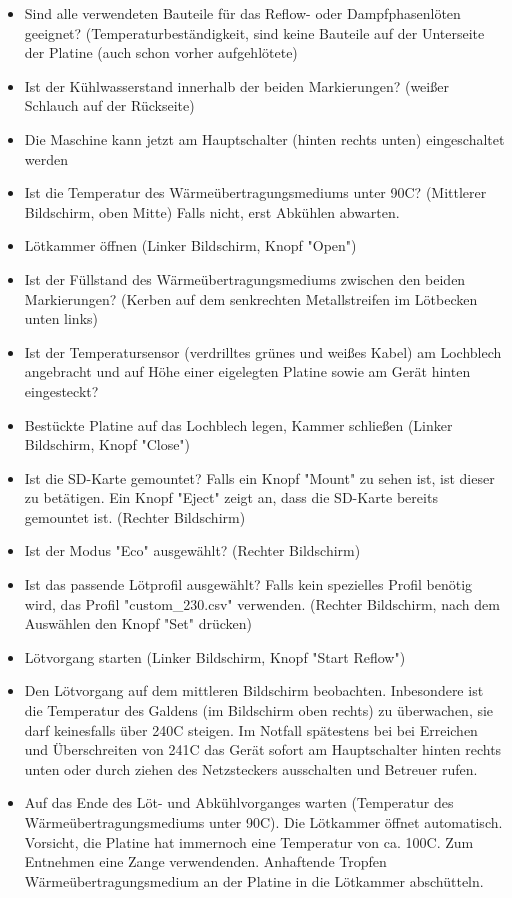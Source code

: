 \documentclass{\basedir/fablab-document}
\begin{document}
	\begin{itemize}

	\item Sind alle verwendeten Bauteile für das Reflow- oder Dampfphasenlöten geeignet? (Temperaturbeständigkeit, sind keine Bauteile auf der Unterseite der Platine (auch schon vorher aufgehlötete)
	\item Ist der Kühlwasserstand innerhalb der beiden Markierungen? (weißer Schlauch auf der Rückseite) 
	\item Die Maschine kann jetzt am Hauptschalter (hinten rechts unten) eingeschaltet werden
	\item Ist die Temperatur des Wärmeübertragungsmediums unter 90C? (Mittlerer Bildschirm, oben Mitte) Falls nicht, erst Abkühlen abwarten.
	\item Lötkammer öffnen (Linker Bildschirm, Knopf "Open")
	\item Ist der Füllstand des Wärmeübertragungsmediums zwischen den beiden Markierungen? (Kerben auf dem senkrechten Metallstreifen im Lötbecken unten links)
	\item Ist der Temperatursensor (verdrilltes grünes und weißes Kabel) am Lochblech angebracht und auf Höhe einer eigelegten Platine sowie am Gerät hinten eingesteckt?
	\item Bestückte Platine auf das Lochblech legen, Kammer schließen (Linker Bildschirm, Knopf "Close")
	\item Ist die SD-Karte gemountet? Falls ein Knopf "Mount" zu sehen ist, ist dieser zu betätigen. Ein Knopf "Eject" zeigt an, dass die SD-Karte bereits gemountet ist. (Rechter Bildschirm)
	\item Ist der Modus "Eco" ausgewählt? (Rechter Bildschirm)
	\item Ist das passende Lötprofil ausgewählt? Falls kein spezielles Profil benötig wird, das Profil "custom_230.csv" verwenden. (Rechter Bildschirm, nach dem Auswählen den Knopf "Set" drücken)
	\item Lötvorgang starten (Linker Bildschirm, Knopf "Start Reflow")
	\item Den Lötvorgang auf dem mittleren Bildschirm beobachten. Inbesondere ist die Temperatur des Galdens (im Bildschirm oben rechts) zu überwachen, sie darf keinesfalls über 240C steigen. Im Notfall spätestens bei bei Erreichen und Überschreiten von 241C das Gerät sofort am Hauptschalter hinten rechts unten oder durch ziehen des Netzsteckers ausschalten und Betreuer rufen. 
	\item Auf das Ende des Löt- und Abkühlvorganges warten (Temperatur des Wärmeübertragungsmediums unter 90C). Die Lötkammer öffnet automatisch. Vorsicht, die Platine hat immernoch eine Temperatur von ca. 100C. Zum Entnehmen eine Zange verwendenden. Anhaftende Tropfen Wärmeübertragungsmedium an der Platine in die Lötkammer abschütteln.

\end{itemize}
\end{document}

